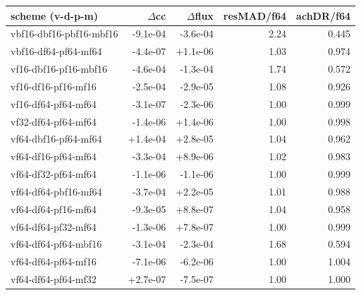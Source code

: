 \begin{tabular}{lrrrr}
\toprule
scheme (v-d-p-m) & $\Delta$cc & $\Delta$flux & resMAD/f64 & achDR/f64 \\
\midrule
vbf16-dbf16-pbf16-mbf16 & -9.1e-04 & -3.6e-04 & 2.24 & 0.445 \\
vbf16-df64-pf64-mf64 & -4.4e-07 & +1.1e-06 & 1.03 & 0.974 \\
vf16-dbf16-pf16-mbf16 & -4.6e-04 & -1.3e-04 & 1.74 & 0.572 \\
vf16-df16-pf16-mf16 & -2.5e-04 & -2.9e-05 & 1.08 & 0.926 \\
vf16-df64-pf64-mf64 & -3.1e-07 & -2.3e-06 & 1.00 & 0.999 \\
vf32-df64-pf64-mf64 & -1.4e-06 & +1.4e-06 & 1.00 & 0.998 \\
vf64-dbf16-pf64-mf64 & +1.4e-04 & +2.8e-05 & 1.04 & 0.962 \\
vf64-df16-pf64-mf64 & -3.3e-04 & +8.9e-06 & 1.02 & 0.983 \\
vf64-df32-pf64-mf64 & -1.1e-06 & -1.1e-06 & 1.00 & 0.999 \\
vf64-df64-pbf16-mf64 & -3.7e-04 & +2.2e-05 & 1.01 & 0.988 \\
vf64-df64-pf16-mf64 & -9.3e-05 & +8.8e-07 & 1.04 & 0.958 \\
vf64-df64-pf32-mf64 & -1.3e-06 & +7.8e-07 & 1.00 & 0.999 \\
vf64-df64-pf64-mbf16 & -3.1e-04 & -2.3e-04 & 1.68 & 0.594 \\
vf64-df64-pf64-mf16 & -7.1e-06 & -6.2e-06 & 1.00 & 1.004 \\
vf64-df64-pf64-mf32 & +2.7e-07 & -7.5e-07 & 1.00 & 1.000 \\
\bottomrule
\end{tabular}